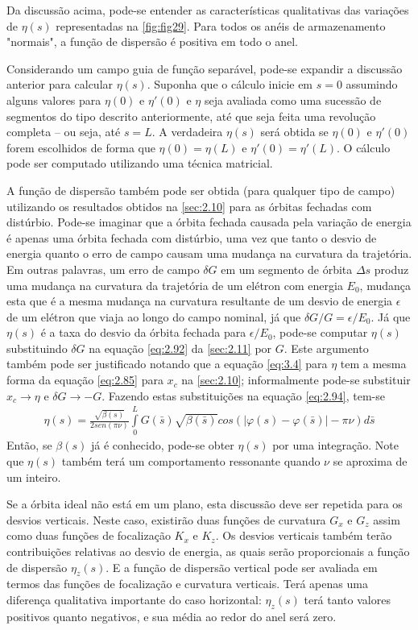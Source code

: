 Da discussão acima, pode-se entender as características qualitativas das variações de $\eta(s)$ representadas na \autoref{fig:fig29}. Para todos os anéis de armazenamento "normais", a função de dispersão é positiva em todo o anel.

Considerando um campo guia de função separável, pode-se expandir a discussão anterior para calcular $\eta(s)$. Suponha que o cálculo inicie em $s=0$ assumindo alguns valores para $\eta(0)$ e $\eta'(0)$ e $\eta$ seja avaliada como uma sucessão de segmentos do tipo descrito anteriormente, até que seja feita uma revolução completa --  ou seja, até $s=L$. A verdadeira $\eta(s)$ será obtida se $\eta(0)$ e $\eta'(0)$ forem escolhidos de forma que $\eta(0) = \eta(L)$ e $\eta'(0) = \eta'(L)$. O cálculo pode ser computado utilizando uma técnica matricial.

A função de dispersão também pode ser obtida (para qualquer tipo de campo) utilizando os resultados obtidos na \autoref{sec:2.10} para as órbitas fechadas com distúrbio. Pode-se imaginar que a órbita fechada causada pela variação de energia é apenas uma órbita fechada com distúrbio, uma vez que tanto o desvio de energia quanto o erro de campo causam uma mudança na curvatura da trajetória. Em outras palavras, um erro de campo $\delta G$ em um segmento de órbita $\Delta s$ produz uma mudança na curvatura da trajetória de um elétron com energia $E_0$, mudança esta que é a mesma mudança na curvatura resultante de um desvio de energia $\epsilon$ de um elétron que viaja ao longo do campo nominal, já que $\delta G/G = \epsilon/E_0$. Já que $\eta(s)$ é a taxa do desvio da órbita fechada para $\epsilon/E_0$, pode-se computar $\eta(s)$ substituindo $\delta G$ na equação \eqref{eq:2.92} da \autoref{sec:2.11} por $G$. Este argumento também pode ser justificado notando que a equação \eqref{eq:3.4} para $\eta$ tem a mesma forma da equação \eqref{eq:2.85} para $x_c$ na \autoref{sec:2.10}; informalmente pode-se substituir $x_c \rightarrow \eta$ e $\delta G \rightarrow -G$. Fazendo estas substituições na equação \eqref{eq:2.94}, tem-se
\begin{align}
	\eta(s) = \frac{\sqrt{\beta(s)}}{2sen(\pi\nu)}\int\limits_{0}^{L}G(\bar{s})\sqrt{\beta(\bar{s})}cos(|\varphi(s)-\varphi(\bar{s})|-\pi\nu)d\bar{s}
\end{align}
Então, se $\beta(s)$ já é conhecido, pode-se obter $\eta(s)$ por uma integração. Note que $\eta(s)$ também terá um comportamento ressonante quando $\nu$ se aproxima de um inteiro.

Se a órbita ideal não está em um plano, esta discussão deve ser repetida para os desvios verticais. Neste caso, existirão duas funções de curvatura $G_x$ e $G_z$ assim como duas funções de focalização $K_x$ e $K_z$. Os desvios verticais também terão contribuições relativas ao desvio de energia, as quais serão proporcionais a função de dispersão $\eta_z(s)$. E a função de dispersão vertical pode ser avaliada em termos das funções de focalização e curvatura verticais. Terá apenas uma diferença qualitativa importante do caso horizontal: $\eta_z(s)$ terá tanto valores positivos quanto negativos, e sua média ao redor do anel será zero.